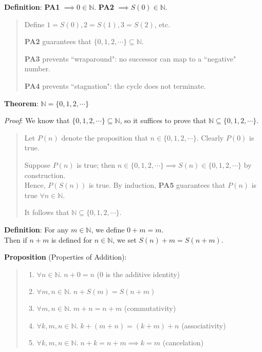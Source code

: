 \documentclass[11pt]{article}
\begin{document}
\textbf{Definition}: \textbf{PA1} $\implies 0 \in \mathbb{N}$. \textbf{PA2} $\implies S(0) \in \mathbb{N}$.
\begin{quote}\vspace{-0.3cm}
	Define $1 = S(0), 2 = S(1), 3 = S(2)$, etc.

	\textbf{PA2} guarantees that $\{0, 1, 2, \cdots\} \subseteq \mathbb{N}$.

	\textbf{PA3} prevents ``wraparound": no successor can map to a ``negative" number.

	\textbf{PA4} prevents ``stagnation": the cycle does not terminate.
\end{quote}

\textbf{Theorem}: $\mathbb{N} = \{0, 1, 2, \cdots\}$

\emph{Proof}: We know that $\{0, 1, 2, \cdots\} \subseteq \mathbb{N}$, so it suffices to prove that $\mathbb{N} \subseteq \{0, 1, 2, \cdots\}$.

\begin{quote}\vspace{-0.3cm}
	Let $P(n)$ denote the proposition that $n \in \{0, 1, 2, \cdots\}$. Clearly $P(0)$ is true.

	Suppose $P(n)$ is true; then $n \in \{0, 1, 2, \cdots\} \implies S(n) \in \{0, 1, 2, \cdots\}$ by construction.\\
	Hence, $P(S(n))$ is true. By induction, \textbf{PA5} guarantees that $P(n)$ is true $\forall n \in \mathbb{N}$.

	It follows that $\mathbb{N} \subseteq \{0, 1, 2, \cdots\}$.
\end{quote}

\textbf{Definition}: For any $m \in \mathbb{N}$, we define $0 + m = m$.\\
Then if $n + m$ is defined for $n \in \mathbb{N}$, we set $S(n) + m = S(n + m)$.

\textbf{Proposition} (Properties of Addition):
\begin{quote}\vspace{-0.3cm}
	\begin{enumerate}
	\item $\forall n \in \mathbb{N}.\; n + 0 = n$ \hspace{4.2cm} (0 is the additive identity)
	\item $\forall m,n \in \mathbb{N}.\; n + S(m) = S(n + m)$
	\item $\forall m,n \in \mathbb{N}.\; m + n = n + m$ \hspace{2.8cm} (commutativity)
	\item $\forall k,m,n \in \mathbb{N}.\; k + (m+n) = (k+m) + n$ \hspace{0.5cm} (associativity)
	\item $\forall k,m,n \in \mathbb{N}.\; n + k = n + m \implies k = m$ \hspace{0.5cm} (cancelation)
	\end{enumerate}
\end{quote}
\end{document}
